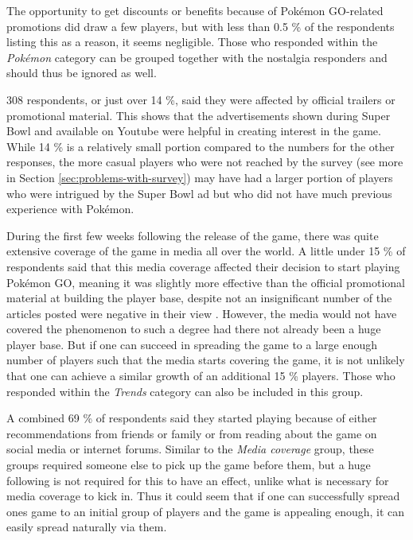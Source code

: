 The opportunity to get discounts or benefits because of Pokémon GO-related promotions did draw a few players, but with less than 0.5 \% of the respondents listing this as a reason, it seems negligible. Those who responded within the \emph{Pokémon} category can be grouped together with the nostalgia responders and should thus be ignored as well.

308 respondents, or just over 14 \%, said they were affected by official trailers or promotional material. This shows that the advertisements shown during Super Bowl and available on Youtube were helpful in creating interest in the game. While 14 \% is a relatively small portion compared to the numbers for the other responses, the more casual players who were not reached by the survey (see more in Section \ref{sec:problems-with-survey}) may have had a larger portion of players who were intrigued by the Super Bowl ad but who did not have much previous experience with Pokémon. 

During the first few weeks following the release of the game, there was quite extensive coverage of the game in media all over the world. A little under 15 \% of respondents said that this media coverage affected their decision to start playing Pokémon GO, meaning it was slightly more effective than the official promotional material at building the player base, despite not an insignificant number of the articles posted were negative in their view . However, the media would not have covered the phenomenon to such a degree had there not already been a huge player base. But if one can succeed in spreading the game to a large enough number of players such that the media starts covering the game, it is not unlikely that one can achieve a similar growth of an additional 15 \% players. Those who responded within the \emph{Trends} category can also be included in this group.

A combined 69 \% of respondents said they started playing because of either recommendations from friends or family or from reading about the game on social media or internet forums. Similar to the \emph{Media coverage} group, these groups required someone else to pick up the game before them, but a huge following is not required for this to have an effect, unlike what is necessary for media coverage to kick in. Thus it could seem that if one can successfully spread ones game to an initial group of players and the game is appealing enough, it can easily spread naturally via them.

